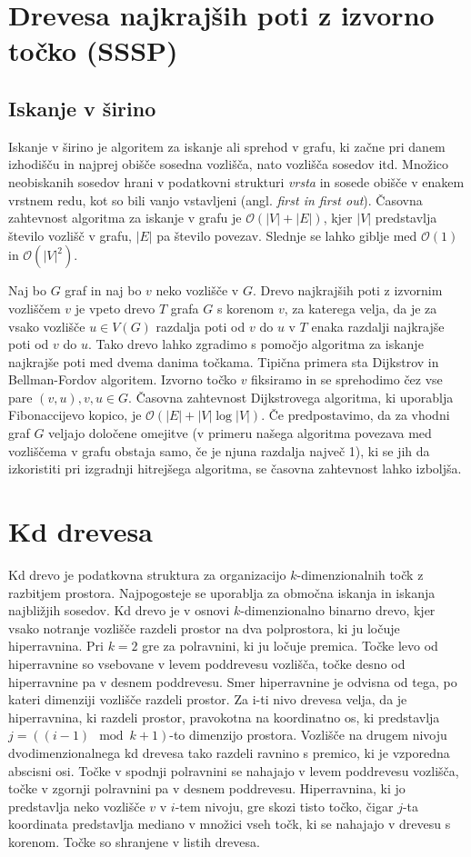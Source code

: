 \documentclass[a4paper, 12pt]{book}
\newcommand{\OO}{\ensuremath{\mathcal{O}}} %
\begin{document}
\section{Drevesa najkrajših poti z izvorno točko (SSSP)}
\subsection*{Iskanje  v širino}
Iskanje v širino je algoritem za iskanje ali sprehod v grafu, ki začne pri danem izhodišču in najprej obišče sosedna vozlišča, nato vozlišča sosedov itd. Množico neobiskanih sosedov hrani v podatkovni strukturi \textit{vrsta} in sosede obišče v enakem vrstnem redu, kot so bili vanjo vstavljeni (angl. \textit{first in first out}). Časovna zahtevnost algoritma za iskanje v grafu je $\OO(|V| + |E|)$, kjer $|V|$ predstavlja število vozlišč v grafu, $|E|$ pa število povezav. Slednje se lahko giblje med $\OO(1)$ in $\OO(|V|^2)$.

\bigbreak
Naj bo $G$ graf in naj bo $v$ neko vozlišče v $G$.
Drevo najkrajših poti z izvornim vozliščem $v$ je vpeto drevo $T$ grafa $G$ s korenom $v$, za katerega velja, da je za vsako vozlišče $u\in V(G)$ razdalja poti od $v$ do $u$ v $T$ enaka razdalji najkrajše poti od $v$ do $u$. Tako drevo lahko zgradimo s pomočjo algoritma za iskanje najkrajše poti med dvema danima točkama. Tipična primera sta Dijkstrov in Bellman-Fordov algoritem. Izvorno točko $v$ fiksiramo in se sprehodimo čez vse pare $(v, u), v,u \in G.$ Časovna zahtevnost Dijkstrovega algoritma, ki uporablja Fibonaccijevo kopico, je $\OO(|E|+|V|\log |V|)$. Če predpostavimo, da za vhodni graf $G$ veljajo določene omejitve (v primeru našega algoritma povezava med vozliščema v grafu obstaja samo, če je njuna razdalja največ 1), ki se jih da izkoristiti pri izgradnji hitrejšega algoritma, se časovna zahtevnost lahko izboljša.

\section{Kd drevesa}

Kd drevo je podatkovna struktura za organizacijo $k$-dimenzionalnih točk z razbitjem prostora. Najpogosteje se uporablja za območna iskanja in iskanja najbližjih sosedov.
Kd drevo je v osnovi $k$-dimenzionalno binarno drevo, kjer vsako notranje vozlišče razdeli prostor na dva polprostora, ki ju ločuje hiperravnina. Pri $k=2$ gre za polravnini, ki ju ločuje premica. Točke levo od hiperravnine so vsebovane v levem poddrevesu vozlišča, točke desno od hiperravnine pa v desnem poddrevesu. Smer hiperravnine je odvisna od tega, po kateri dimenziji vozlišče razdeli prostor.
Za i-ti nivo drevesa velja, da je hiperravnina, ki razdeli prostor, pravokotna na koordinatno os, ki predstavlja $j = ((i-1)\mod k + 1)$-to dimenzijo prostora. Vozlišče na drugem nivoju dvodimenzionalnega kd drevesa tako razdeli
ravnino s premico, ki je vzporedna abscisni osi. Točke v spodnji polravnini se nahajajo v levem poddrevesu vozlišča, točke v zgornji polravnini pa v desnem poddrevesu. Hiperravnina, ki jo predstavlja neko vozlišče $v$ v $i$-tem nivoju,
gre skozi tisto točko, čigar $j$-ta koordinata predstavlja mediano v množici vseh točk, ki se nahajajo v drevesu s korenom. Točke so shranjene v listih drevesa.
\end{document}
